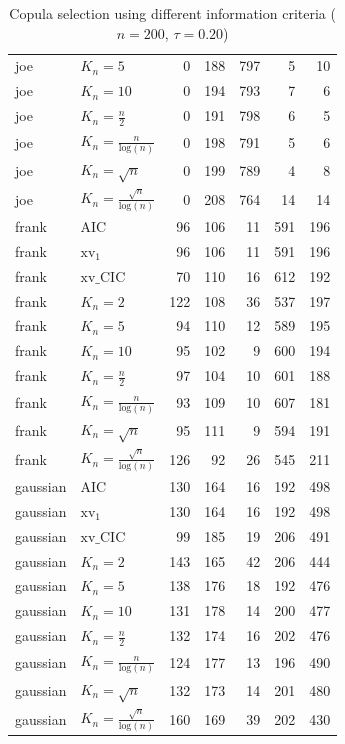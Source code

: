 \begin{table}[htbp]
\begin{tabular}{llrrrrr}
  joe & $K_{n}=5$ & 0 & 188 & 797 & 5 & 10 \\ 
  joe & $K_{n}=10$ & 0 & 194 & 793 & 7 & 6 \\ 
  joe & $K_{n}=\tfrac{n}{2}$ & 0 & 191 & 798 & 6 & 5 \\ 
  joe & $K_{n}=\tfrac{n}{\text{log}(n)}$ & 0 & 198 & 791 & 5 & 6 \\ 
  joe & $K_{n}=\sqrt{n}$ & 0 & 199 & 789 & 4 & 8 \\ 
  joe & $K_{n}=\tfrac{\sqrt{n}}{\text{log}(n)}$ & 0 & 208 & 764 & 14 & 14 \\ 
   \hdashline
frank & AIC & 96 & 106 & 11 & 591 & 196 \\ 
  frank & $\text{xv}_{1}$ & 96 & 106 & 11 & 591 & 196 \\ 
  frank & $\text{xv}\_\text{CIC}$ & 70 & 110 & 16 & 612 & 192 \\ 
  frank & $K_{n}=2$ & 122 & 108 & 36 & 537 & 197 \\ 
  frank & $K_{n}=5$ & 94 & 110 & 12 & 589 & 195 \\ 
  frank & $K_{n}=10$ & 95 & 102 & 9 & 600 & 194 \\ 
  frank & $K_{n}=\tfrac{n}{2}$ & 97 & 104 & 10 & 601 & 188 \\ 
  frank & $K_{n}=\tfrac{n}{\text{log}(n)}$ & 93 & 109 & 10 & 607 & 181 \\ 
  frank & $K_{n}=\sqrt{n}$ & 95 & 111 & 9 & 594 & 191 \\ 
  frank & $K_{n}=\tfrac{\sqrt{n}}{\text{log}(n)}$ & 126 & 92 & 26 & 545 & 211 \\ 
   \hdashline
gaussian & AIC & 130 & 164 & 16 & 192 & 498 \\ 
  gaussian & $\text{xv}_{1}$ & 130 & 164 & 16 & 192 & 498 \\ 
  gaussian & $\text{xv}\_\text{CIC}$ & 99 & 185 & 19 & 206 & 491 \\ 
  gaussian & $K_{n}=2$ & 143 & 165 & 42 & 206 & 444 \\ 
  gaussian & $K_{n}=5$ & 138 & 176 & 18 & 192 & 476 \\ 
  gaussian & $K_{n}=10$ & 131 & 178 & 14 & 200 & 477 \\ 
  gaussian & $K_{n}=\tfrac{n}{2}$ & 132 & 174 & 16 & 202 & 476 \\ 
  gaussian & $K_{n}=\tfrac{n}{\text{log}(n)}$ & 124 & 177 & 13 & 196 & 490 \\ 
  gaussian & $K_{n}=\sqrt{n}$ & 132 & 173 & 14 & 201 & 480 \\ 
  gaussian & $K_{n}=\tfrac{\sqrt{n}}{\text{log}(n)}$ & 160 & 169 & 39 & 202 & 430 \\ 
   \hline
\end{tabular}
\caption{Copula selection using different information criteria ($n = 200$, $\tau = 0.20$)} 
\end{table}


